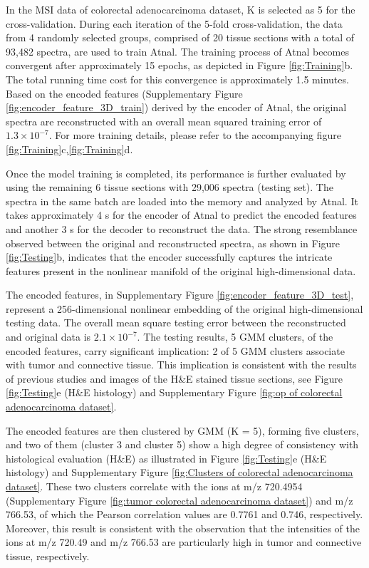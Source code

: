 \documentclass{WileyMSP-template}
\begin{document}
In the MSI data of colorectal adenocarcinoma 
dataset, K is selected as 5 for the cross-validation. During 
each iteration of the 5-fold cross-validation, the data from 4 randomly selected groups, 
comprised of 20 tissue sections with a total of 93,482 spectra, 
are used to train Atnal. 
The training process of Atnal becomes convergent after approximately 15 epochs, 
as depicted in Figure \ref{fig:Training}b. The total running time cost for this 
convergence is approximately 1.5 minutes. Based on the encoded features 
(Supplementary Figure \ref{fig:encoder_feature_3D_train}) derived by 
the encoder of Atnal, the original spectra are 
reconstructed with an overall mean squared training error of $1.3 \times 10^{-7}$. For more training details, 
please refer to the accompanying figure \ref{fig:Training}c,\ref{fig:Training}d. 

Once the model training is completed, its performance is further evaluated by 
using the remaining 6 tissue sections with 29,006 spectra (testing set).
The spectra in the same batch 
are loaded into the memory and analyzed by Atnal. 
It takes approximately 4 s for the encoder of Atnal 
to predict the encoded features and another 3 s for the decoder 
to reconstruct the data. 
The strong resemblance observed between the original and reconstructed spectra, 
as shown in Figure \ref{fig:Testing}b, indicates that the encoder 
successfully captures the intricate features present in the nonlinear 
manifold of the original high-dimensional data. 

The encoded features, in Supplementary Figure \ref{fig:encoder_feature_3D_test}, represent a 
256-dimensional nonlinear embedding of the original high-dimensional testing data. 
The overall mean square testing error between the reconstructed and original data
is  $2.1 \times 10^{-7}$. 
The testing results, 5 GMM clusters, of the encoded features, carry significant 
implication: 2 of 5 GMM clusters associate with tumor and connective tissue. 
This implication is consistent with the results of previous studies 
\cite{abdelmoula2018interactive} \cite{oetjen2015benchmark} 
and images of the H\&E stained tissue sections,  see 
Figure \ref{fig:Testing}e (H\&E histology)   
and Supplementary Figure \ref{fig:op of colorectal adenocarcinoma dataset}. 

The encoded features are then clustered by GMM (K = 5), forming five clusters, 
and two of them (cluster 3 and cluster 5) show
a high degree of consistency with 
histological evaluation (H\&E) as illustrated  
in Figure \ref{fig:Testing}e (H\&E histology) and  
Supplementary Figure \ref{fig:Clusters of colorectal adenocarcinoma dataset}. 
These two clusters correlate with 
the ions at m/z 720.4954
(Supplementary Figure \ref{fig:tumor colorectal adenocarcinoma dataset}) 
and m/z 766.53, of which the  Pearson correlation 
values are 0.7761 and 0.746, respectively.
Moreover, this result is consistent with the observation that 
the intensities of the ions at m/z 720.49 and m/z 766.53 are 
particularly high in tumor and connective tissue, respectively. 
 
\end{document}
